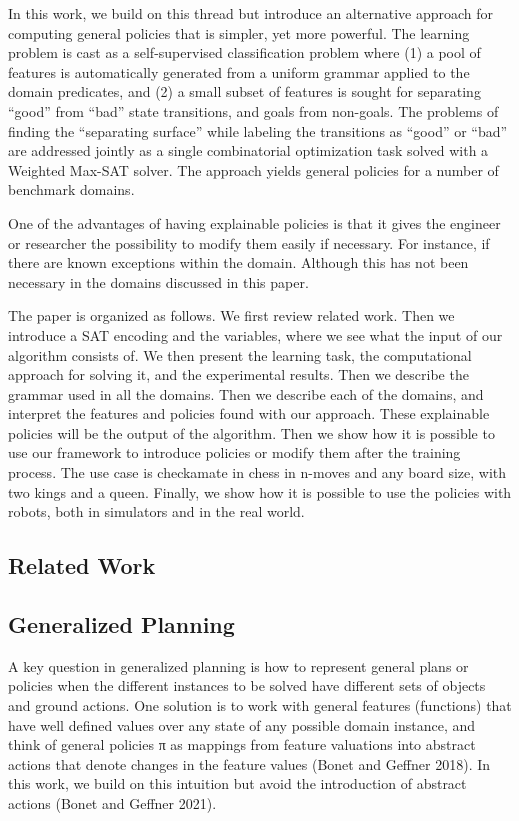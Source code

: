 \documentclass[a4paper]{article}
\begin{document}
In this work, we build on this thread but introduce an alternative approach for computing general policies that is simpler, yet more powerful. The learning problem is cast as a self-supervised classification problem where (1) a pool of features is automatically generated from a uniform grammar applied to the domain predicates, and (2) a small subset of features is sought for separating “good” from “bad” state transitions, and goals from non-goals. The problems of finding the “separating surface” while labeling the transitions as “good” or “bad” are addressed jointly as a single combinatorial optimization task solved with a Weighted Max-SAT solver. The approach yields general policies for a number of benchmark domains.

One of the advantages of having explainable policies is that it gives the engineer or researcher the possibility to modify them easily if necessary. For instance, if there are known exceptions within the domain. Although this has not been necessary in the domains discussed in this paper.

The paper is organized as follows. We first review related work. Then we introduce a SAT encoding and the variables, where we see what the input of our algorithm consists of. We then present the learning task, the computational approach for solving it, and the experimental results. Then we describe the grammar used in all the domains. Then we describe each of the domains, and interpret the features and policies found with our approach. These explainable policies will be the output of the algorithm. Then we show how it is possible to use our framework to introduce policies or modify them after the training process. The use case is checkamate in chess in n-moves and any board size, with two kings and a queen. Finally, we show how it is possible to use the policies with robots, both in simulators and in the real world.

\subsection{Related Work}


\subsection{Generalized Planning}

A key question in generalized planning is how to represent general plans or policies when the different instances to be solved have different sets of objects and ground actions. One solution is to work with general features (functions) that have well defined values over any state of any possible domain instance, and think of general policies π as mappings from feature valuations into abstract actions that denote changes in the feature values (Bonet and Geffner 2018). In this work, we build on this intuition but avoid the introduction of abstract actions (Bonet and Geffner 2021).
\end{document}
